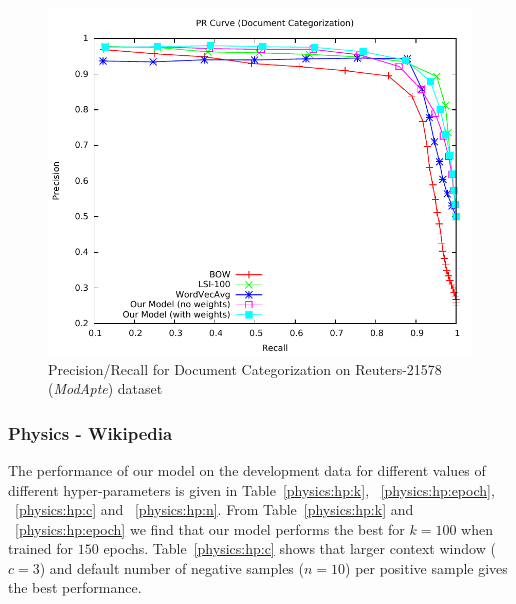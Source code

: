 \begin{figure}[tb]
\centering
        \includegraphics[width=0.8\columnwidth]{figs/pr/reuter-cs-scala.pdf}
        \vskip -4mm
    \caption{\footnotesize Precision/Recall for Document Categorization on Reuters-21578 (\emph{ModApte}) dataset} 
    \label{fig:pr:reuter:cs}
\end{figure}

\subsubsection{Physics - Wikipedia}
The performance of our model on the development data for different values of different hyper-parameters is given in Table~\ref{physics:hp:k}, ~\ref{physics:hp:epoch}, ~\ref{physics:hp:c} and ~\ref{physics:hp:n}. From Table~\ref{physics:hp:k} and ~\ref{physics:hp:epoch} we find that our model performs the best for $k=100$ when trained for $150$ epochs. Table~\ref{physics:hp:c} shows that larger context window ($c = 3$) and default number of negative samples ($n = 10$) per positive sample gives the best performance. 

